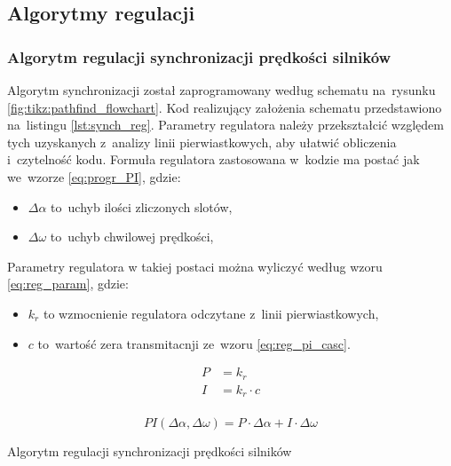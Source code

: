 \documentclass[11pt]{article}
\begin{document}
\subsection{Algorytmy regulacji}
\subsubsection{Algorytm regulacji synchronizacji prędkości silników}
Algorytm synchronizacji został zaprogramowany według schematu na~rysunku \ref{fig:tikz:pathfind_flowchart}.
Kod realizujący założenia schematu przedstawiono na~listingu \ref{lst:synch_reg}.
Parametry regulatora należy przekształcić względem tych uzyskanych z~analizy linii pierwiastkowych, aby ułatwić obliczenia i~czytelność kodu.
Formuła regulatora zastosowana w~kodzie ma postać jak we~wzorze \ref{eq:progr_PI}, gdzie:
\begin{itemize}
	\item $ \Delta \alpha $ to~uchyb ilości zliczonych slotów,
	\item $ \Delta \omega $ to~uchyb chwilowej prędkości,
\end{itemize}
Parametry regulatora w takiej postaci można wyliczyć według wzoru \ref{eq:reg_param}, gdzie:
\begin{itemize}
	\item $ k_r $ to wzmocnienie regulatora odczytane z~linii pierwiastkowych,
	\item $ c $ to~wartość zera transmitacnji ze~wzoru \ref{eq:reg_pi_casc}.
\end{itemize}

\begin{equation} \label{eq:reg_param}
\begin{aligned}
	P &=  k_r\\
	I &=  k_r \cdot c\\
\end{aligned}
\end{equation}

\begin{equation} \label{eq:progr_PI}
	PI \left( \Delta \alpha, \Delta \omega \right) = P \cdot \Delta \alpha + I \cdot \Delta \omega
\end{equation}

\begin{listing}[htb]
\caption{Algorytm regulacji synchronizacji prędkości silników}
\inputminted[firstline=164, lastline=190, frame=lines, linenos, breaklines]{cpp}{../src/platformMotors.cpp}
\label{lst:synch_reg}
\end{listing}
\end{document}
